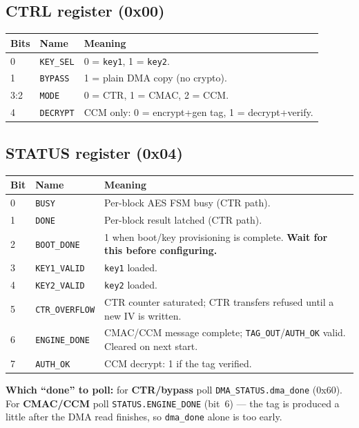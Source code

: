 \documentclass[11pt,a4paper]{article}
\newcommand{\reg}[1]{\texttt{#1}}
\newcommand{\bit}[1]{\texttt{#1}}
\begin{document}
\subsection{CTRL register (0x00)}\label{sec:ctrl}
\begin{longtable}{@{}p{} p{} p{}@{}}
\hline
\textbf{Bits} & \textbf{Name} & \textbf{Meaning} \\ \hline \endhead
0     & \bit{KEY\_SEL} & 0 = \reg{key1}, 1 = \reg{key2}. \\
1     & \bit{BYPASS}   & 1 = plain DMA copy (no crypto). \\
3:2   & \bit{MODE}     & 0 = CTR, 1 = CMAC, 2 = CCM. \\
4     & \bit{DECRYPT}  & CCM only: 0 = encrypt+gen tag, 1 = decrypt+verify. \\ \hline
\end{longtable}

\subsection{STATUS register (0x04)}\label{sec:status}
\begin{longtable}{@{}p{} p{} p{}@{}}
\hline
\textbf{Bit} & \textbf{Name} & \textbf{Meaning} \\ \hline \endhead
0 & \bit{BUSY}          & Per-block AES FSM busy (CTR path). \\
1 & \bit{DONE}          & Per-block result latched (CTR path). \\
2 & \bit{BOOT\_DONE}    & 1 when boot/key provisioning is complete. \textbf{Wait for this before configuring.} \\
3 & \bit{KEY1\_VALID}   & \reg{key1} loaded. \\
4 & \bit{KEY2\_VALID}   & \reg{key2} loaded. \\
5 & \bit{CTR\_OVERFLOW} & CTR counter saturated; CTR transfers refused until a new IV is written. \\
6 & \bit{ENGINE\_DONE}  & CMAC/CCM message complete; \reg{TAG\_OUT}/\bit{AUTH\_OK} valid. Cleared on next start. \\
7 & \bit{AUTH\_OK}      & CCM decrypt: 1 if the tag verified. \\ \hline
\end{longtable}

\noindent\textbf{Which ``done'' to poll:} for \textbf{CTR/bypass} poll
\bit{DMA\_STATUS.dma\_done} (0x60). For \textbf{CMAC/CCM} poll \bit{STATUS.ENGINE\_DONE} (bit~6)
--- the tag is produced a little after the DMA read finishes, so \texttt{dma\_done} alone is too
early.
\end{document}
